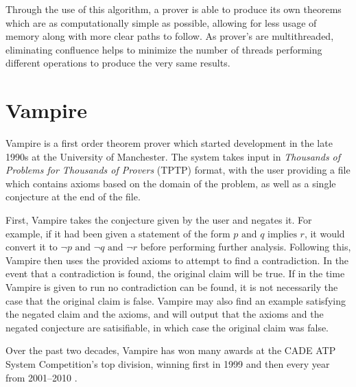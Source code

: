 Through the use of this algorithm, a prover is able to produce its own theorems which are as computationally simple as possible, allowing for less usage of memory along with more clear paths to follow. As prover's are multithreaded, eliminating confluence helps to minimize the number of threads performing different operations to produce the very same results.

\section{Vampire}

Vampire is a first order theorem prover which started development in the late 1990s at the University of Manchester. The system takes input in \textit{Thousands of Problems for Thousands of Provers} (TPTP) format, with the user providing a file which contains axioms based on the domain of the problem, as well as a single conjecture at the end of the file.

First, Vampire takes the conjecture given by the user and negates it. For example, if it had been given a statement of the form $p \text{ and } q \text{ implies } r$, it would convert it to $\neg p \text{ and } \neg q \text{ and } \neg r$ before performing further analysis. Following this, Vampire then uses the provided axioms to attempt to find a contradiction. In the event that a contradiction is found, the original claim will be true. If in the time Vampire is given to run no contradiction can be found, it is not necessarily the case that the original claim is false. Vampire may also find an example satisfying the negated claim and the axioms, and will output that the axioms and the negated conjecture are satisifiable, in which case the original claim was false.

Over the past two decades, Vampire has won many awards at the CADE ATP System Competition's top division, winning first in 1999 and then every year from 2001--2010 \cite{VampireAwards}.
